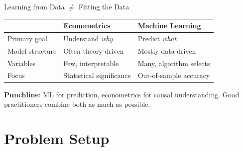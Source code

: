 \documentclass[10pt]{beamer}
\begin{document}
\begin{frame}{Learning from Data $\neq$ Fitting the Data}
\begin{center}
\begin{tabular}{lll}
\toprule
& \textbf{Econometrics} & \textbf{Machine Learning} \\
\midrule
Primary goal & Understand \emph{why} & Predict \emph{what} \\
Model structure & Often theory-driven & Mostly data-driven \\
Variables & Few, interpretable & Many, algorithm selects \\
Focus & Statistical significance & Out-of-sample accuracy \\
\bottomrule
\end{tabular}
\end{center}

\vspace{0.5em}
\textbf{Punchline}: ML for prediction, econometrics for causal understanding. Good practitioners combine both as much as possible. 

\end{frame}



\section{Problem Setup}
\end{document}
